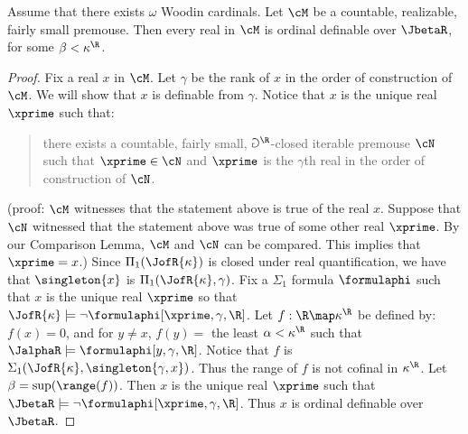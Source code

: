 \begin{corollary}
\label{Every_Real_Is_Definable}
Assume that there exists $\omega$ Woodin cardinals. Let $\cM$ be
a countable, realizable, fairly small premouse. Then every
real in $\cM$ is ordinal definable over $\JbetaR$, for some
$\beta<\kappa^{\R}$.
\end{corollary}
\begin{proof}
Fix a real $x$ in $\cM$. Let $\gamma$ be the rank of $x$ in the order
of construction of $\cM$. We will show that $x$ is definable from
$\gamma$. Notice that $x$ is the unique real $\xprime$ such that:
\begin{quote}
there exists a countable, fairly small, $\Game^{\R}$-closed iterable
premouse $\cN$ such that $\xprime\in\cN$ and $\xprime$ is
the $\gamma$th real in
the order of construction of $\cN$.
\end{quote}
(proof:
$\cM$ witnesses that the statement above is true of the real $x$. Suppose
that $\cN$ witnessed that the statement above was true of some other
real $\xprime$. By our Comparison Lemma, $\cM$ and $\cN$ can be compared.
This implies that $\xprime=x$.) Since $\Pi_1(\JofR{\kappa})$ is
closed under real quantification, we have that
$\singleton{x}$ is $\Pi_1(\JofR{\kappa},\gamma)$. Fix a
$\Sigma_1$ formula
$\formulaphi$ such that $x$ is the unique real $\xprime$ so that
$\JofR{\kappa}\models\neg\formulaphi[\xprime,\gamma,\R]$.
Let $f:\R\map\kappa^{\R}$ be defined by: $f(x)=0$, and for $y\not= x$,
$f(y) = $ the least $\alpha<\kappa^{\R}$ such that
$\JalphaR\models\formulaphi[y,\gamma,\R]$. Notice that $f$ is
$\Sigma_1(\JofR{\kappa},\singleton{\gamma,x})$. Thus the range of $f$ is
not
cofinal in $\kappa^{\R}$. Let $\beta=\sup(\range(f))$. Then $x$ is the
unique real $\xprime$ such that
$\JbetaR\models\neg\formulaphi[\xprime,\gamma,\R]$. Thus $x$ is ordinal
definable over $\JbetaR$.
\end{proof}
